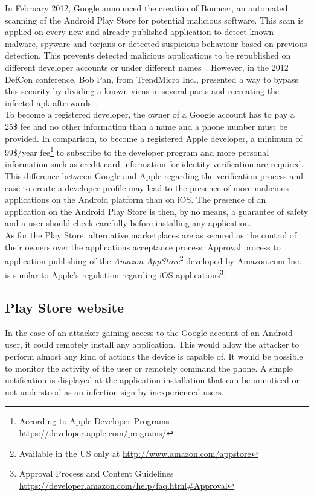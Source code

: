 In February 2012, Google announced the creation of Bouncer, an automated scanning of the Android Play Store for potential malicious software.
This scan is applied on every new and already published application to detect known malware, spyware and torjans or detected suspicious behaviour based on previous detection.
This prevents detected malicious applications to be republished on different developer accounts or under different names~\cite{secu-bouncer}.
However, in the 2012 DefCon conference, Bob Pan, from TrendMicro Inc., presented a way to bypass this security by dividing a known virus in several parts and recreating the infected apk afterwards~\cite{secu-defcon}.\\

To become a registered developer, the owner of a Google account has to pay a 25\$ fee and no other information than a name and a phone number must be provided.
In comparison, to become a registered Apple developer, a minimum of 99\$/year fee\footnote{According to Apple Developer Programs \url{https://developer.apple.com/programs/}} to subscribe to the developer program and more personal information such as credit card information for identity verification are required.\\

This difference between Google and Apple regarding the verification process and ease to create a developer profile  may lead to the presence of more malicious applications on the Android platform than on iOS.
The presence of an application on the Android Play Store is then, by no means, a guarantee of safety and a user should check carefully before installing any application.\\

As for the Play Store, alternative marketplaces are as secured as the control of their owners over the applications acceptance process.
Approval process to application publishing of the \emph{Amazon AppStore}\footnote{Available in the US only at \url{http://www.amazon.com/appstore}} developed by Amazon.com Inc. is  similar to Apple's regulation regarding iOS applications\footnote{Approval Process and Content Guidelines \url{https://developer.amazon.com/help/faq.html\#Approval}}.

\subsection{Play Store website}
\label{sec:attack-play-website}

In the case of an attacker gaining access to the Google account of an Android user, it could remotely install any application.
This would allow the attacker to perform almost any kind of actions the device is capable of.
It would be possible to monitor the activity of the user or remotely command the phone.
A simple notification is displayed at the application installation that can be unnoticed or not understood as an infection sign by inexperienced users.

